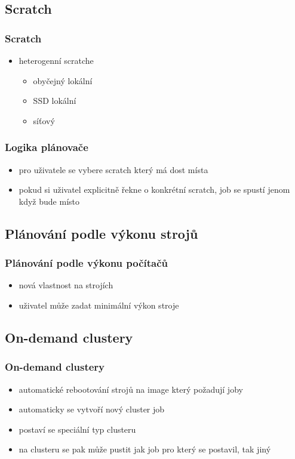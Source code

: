 \documentclass[pdftex,aspectratio=169]{beamer}
\begin{document}
\subsection{Scratch}

\begin{frame}
	\frametitle{Scratch}
	\begin{itemize}
		\item{heterogenní scratche}
		\begin{itemize}
			\item{obyčejný lokální}
			\item{SSD lokální}
			\item{síťový}
		\end{itemize}
	\end{itemize}
\end{frame}

\begin{frame}
	\frametitle{Logika plánovače}
	\begin{itemize}
		\item{pro uživatele se vybere scratch který má dost místa}
		\item{pokud si uživatel explicitně řekne o konkrétní scratch, job se spustí jenom když bude místo}
	\end{itemize}
\end{frame}

\subsection{Plánování podle výkonu strojů}

\begin{frame}
	\frametitle{Plánování podle výkonu počítačů}
	\begin{itemize}
		\item{nová vlastnost na strojích}
		\item{uživatel může zadat minimální výkon stroje}
	\end{itemize}
\end{frame}

\subsection{On-demand clustery}

\begin{frame}
	\frametitle{On-demand clustery}
	\begin{itemize}
		\item{automatické rebootování strojů na image který požadují joby}
		\item{automaticky se vytvoří nový cluster job}
		\item{postaví se speciální typ clusteru}
		\item{na clusteru se pak může pustit jak job pro který se postavil, tak jiný}
	\end{itemize}
\end{frame}
\end{document}
